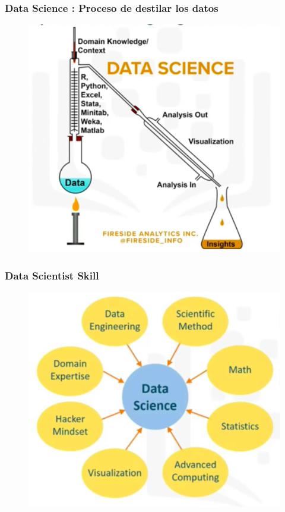 \documentclass{beamer}
\begin{document}
\begin{frame}
\frametitle{Data Science : Proceso de destilar los datos }
\begin{figure}
\includegraphics[scale=0.35]{img/3_DataScience_Distilling}
\end{figure}
\end{frame}

\begin{frame}
\frametitle{Data Scientist Skill }
\begin{figure}
\includegraphics[scale=0.35]{img/3_DataScientist_Skill}
\end{figure}
\end{frame}
\end{document}

